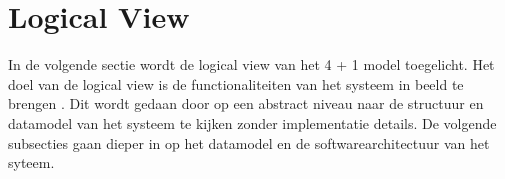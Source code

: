 \section{Logical View}
In de volgende sectie wordt de logical view van het 4 + 1 model toegelicht.
Het doel van de logical view is de functionaliteiten van het systeem in beeld te brengen \parencite{4+1ViewModelPaper}.
Dit wordt gedaan door op een abstract niveau naar de structuur en datamodel van het systeem te kijken zonder implementatie details.
De volgende subsecties gaan dieper in op het datamodel en de softwarearchitectuur van het syteem.


\newpage

